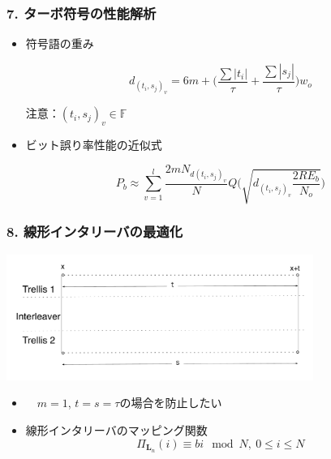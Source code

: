 \documentclass{beamer}  %
\begin{document}
\begin{frame}
\frametitle{7. ターボ符号の性能解析}
\setlength\itemsep{2em}

\begin{itemize}
\setlength\itemsep{1em}

\item 符号語の重み

 $$d_{(t_i,s_j)_v}=6m+\Bigg( \frac{ \sum \left|t_i\right|}{\tau} + \frac{ \sum \left|s_j\right|}{\tau} \Bigg)w_o$$

 注意：$(t_i,s_j)_v \in \mathbb{F}$ 

\item ビット誤り率性能の近似式

 $$P_b \approx \sum_{v=1}^{l} \frac{2mN_{d{(t_i,s_j)_v}}}{N}Q\Bigg( \sqrt{d_{(t_i,s_j)_v}\frac{2RE_b}{N_o}}\Bigg)$$



\end{itemize}

\end{frame}


\begin{frame}
\frametitle{8. 線形インタリーバの最適化}

\begin{center}
\includegraphics[width=10cm]{weight2.pdf}
\end{center}

\begin{itemize}
\setlength\itemsep{2em}
\item 　$m=1$, $t=s=\tau$の場合を防止したい

\item 線形インタリーバのマッピング関数 
 $$
\Pi_{\mathbf{L}_n}(i) \equiv bi  \mod N, \ 0 \leq i \leq N
$$
\end{itemize}

\end{frame}
\end{document}
